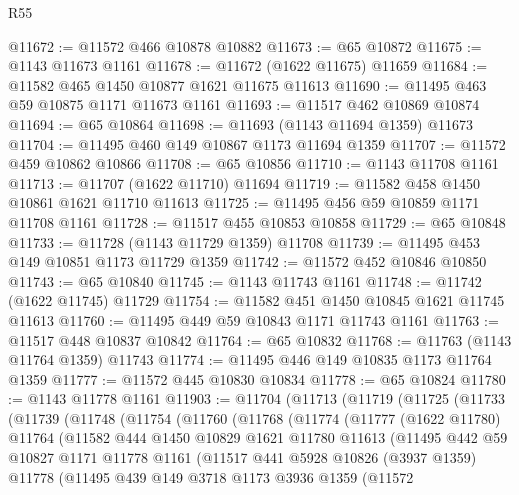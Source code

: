 \begin{lexlean}{R55}
\begin{coremodule}
@11672 := @11572 @466 @10878 @10882
@11673 := @65 @10872
@11675 := @1143 @11673 @1161
@11678 := @11672 (@1622 @11675) @11659
@11684 := @11582 @465 @1450 @10877 @1621 @11675 @11613
@11690 := @11495 @463 @59 @10875 @1171 @11673 @1161
@11693 := @11517 @462 @10869 @10874
@11694 := @65 @10864
@11698 := @11693 (@1143 @11694 @1359) @11673
@11704 := @11495 @460 @149 @10867 @1173 @11694 @1359
@11707 := @11572 @459 @10862 @10866
@11708 := @65 @10856
@11710 := @1143 @11708 @1161
@11713 := @11707 (@1622 @11710) @11694
@11719 := @11582 @458 @1450 @10861 @1621 @11710 @11613
@11725 := @11495 @456 @59 @10859 @1171 @11708 @1161
@11728 := @11517 @455 @10853 @10858
@11729 := @65 @10848
@11733 := @11728 (@1143 @11729 @1359) @11708
@11739 := @11495 @453 @149 @10851 @1173 @11729 @1359
@11742 := @11572 @452 @10846 @10850
@11743 := @65 @10840
@11745 := @1143 @11743 @1161
@11748 := @11742 (@1622 @11745) @11729
@11754 := @11582 @451 @1450 @10845 @1621 @11745 @11613
@11760 := @11495 @449 @59 @10843 @1171 @11743 @1161
@11763 := @11517 @448 @10837 @10842
@11764 := @65 @10832
@11768 := @11763 (@1143 @11764 @1359) @11743
@11774 := @11495 @446 @149 @10835 @1173 @11764 @1359
@11777 := @11572 @445 @10830 @10834
@11778 := @65 @10824
@11780 := @1143 @11778 @1161
@11903 := @11704
    (@11713
      (@11719
        (@11725
          (@11733
            (@11739
              (@11748
                (@11754
                  (@11760
                    (@11768
                      (@11774
                        (@11777
                          (@1622 @11780)
                          @11764
                          (@11582
                            @444
                            @1450
                            @10829
                            @1621
                            @11780
                            @11613
                            (@11495
                              @442
                              @59
                              @10827
                              @1171
                              @11778
                              @1161
                              (@11517
                                @441
                                @5928
                                @10826
                                (@3937 @1359)
                                @11778
                                (@11495
                                  @439
                                  @149
                                  @3718
                                  @1173
                                  @3936
                                  @1359
                                  (@11572

\end{coremodule}
\end{lexlean}
